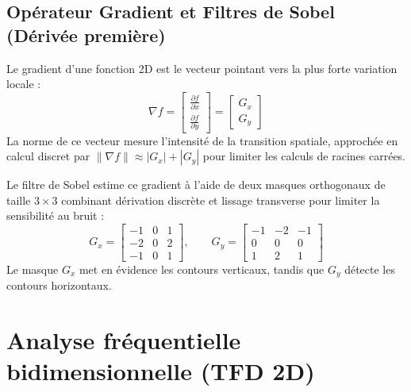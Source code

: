 \subsection{Opérateur Gradient et Filtres de Sobel (Dérivée première)}

Le gradient d'une fonction 2D est le vecteur pointant vers la plus forte variation locale :
\begin{equation}
    \nabla f = \begin{bmatrix} \frac{\partial f}{\partial x} \\ \frac{\partial f}{\partial y} \end{bmatrix} = \begin{bmatrix} G_x \\ G_y \end{bmatrix}
\end{equation}
La norme de ce vecteur mesure l'intensité de la transition spatiale, approchée en calcul discret par $\|\nabla f\| \approx |G_x| + |G_y|$ pour limiter les calculs de racines carrées.

\begin{definition}
    Le filtre de Sobel estime ce gradient à l'aide de deux masques orthogonaux de taille $3 \times 3$ combinant dérivation discrète et lissage transverse pour limiter la sensibilité au bruit :
    \begin{equation}
        G_x = \begin{bmatrix} -1 & 0 & 1 \\ -2 & 0 & 2 \\ -1 & 0 & 1 \end{bmatrix}, \qquad
        G_y = \begin{bmatrix} -1 & -2 & -1 \\ 0 & 0 & 0 \\ 1 & 2 & 1 \end{bmatrix}
    \end{equation}
    Le masque $G_x$ met en évidence les contours verticaux, tandis que $G_y$ détecte les contours horizontaux.
\end{definition}


\section{Analyse fréquentielle bidimensionnelle (TFD 2D)}

